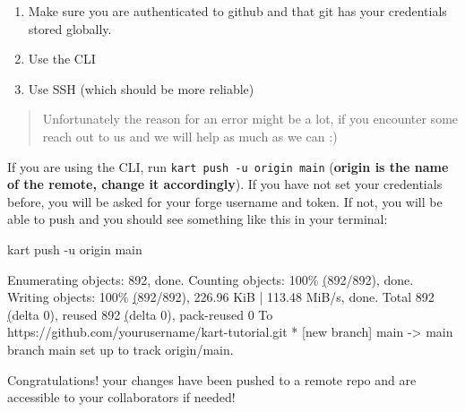 \documentclass[
  letterpaper,
  DIV=11,
  numbers=noendperiod]{scrartcl}
\newenvironment{Shaded}{\begin{snugshade}}{\end{snugshade}}
\newcommand{\AttributeTok}[1]{\textcolor[rgb]{1.00,0.47,0.78}{#1}}
\newcommand{\ErrorTok}[1]{\textcolor[rgb]{1.00,0.33,0.33}{\underline{#1}}}
\newcommand{\ExtensionTok}[1]{\textcolor[rgb]{0.55,0.91,0.99}{#1}}
\newcommand{\KeywordTok}[1]{\textcolor[rgb]{1.00,0.47,0.78}{#1}}
\newcommand{\NormalTok}[1]{\textcolor[rgb]{0.97,0.97,0.95}{#1}}
\newcommand{\OperatorTok}[1]{\textcolor[rgb]{0.97,0.97,0.95}{#1}}
\newcommand{\StringTok}[1]{\textcolor[rgb]{0.95,0.98,0.55}{#1}}
\providecommand{\tightlist}{%
  \setlength{\itemsep}{0pt}\setlength{\parskip}{0pt}}\usepackage{longtable,booktabs,array}
\begin{document}
\begin{enumerate}
\def\labelenumi{\arabic{enumi}.}
\tightlist
\item
  Make sure you are authenticated to github and that git has your
  credentials stored globally.
\item
  Use the CLI
\item
  Use SSH (which should be more reliable)
\end{enumerate}

\begin{quote}
Unfortunately the reason for an error might be a lot, if you encounter
some reach out to us and we will help as much as we can :)
\end{quote}

If you are using the CLI, run \texttt{kart\ push\ -u\ origin\ main}
(\textbf{origin is the name of the remote, change it accordingly}). If
you have not set your credentials before, you will be asked for your
forge username and token. If not, you will be able to push and you
should see something like this in your terminal:

\begin{Shaded}
\begin{Highlighting}[]
\ExtensionTok{kart}\NormalTok{ push }\AttributeTok{{-}u}\NormalTok{ origin main}

\ExtensionTok{Enumerating}\NormalTok{ objects: 892, done.}
\ExtensionTok{Counting}\NormalTok{ objects: 100\% }\ErrorTok{(}\ExtensionTok{892/892}\KeywordTok{)}\ExtensionTok{,}\NormalTok{ done.}
\ExtensionTok{Writing}\NormalTok{ objects: 100\% }\ErrorTok{(}\ExtensionTok{892/892}\KeywordTok{)}\ExtensionTok{,}\NormalTok{ 226.96 KiB }\KeywordTok{|} \ExtensionTok{113.48}\NormalTok{ MiB/s, done.}
\ExtensionTok{Total}\NormalTok{ 892 }\ErrorTok{(}\ExtensionTok{delta}\NormalTok{ 0}\KeywordTok{)}\ExtensionTok{,}\NormalTok{ reused 892 }\ErrorTok{(}\ExtensionTok{delta}\NormalTok{ 0}\KeywordTok{)}\ExtensionTok{,}\NormalTok{ pack{-}reused 0}
\ExtensionTok{To}\NormalTok{ https://github.com/yourusername/kart{-}tutorial.git}
 \ExtensionTok{*}\NormalTok{ [new branch]      main }\AttributeTok{{-}}\OperatorTok{\textgreater{}}\NormalTok{ main}
\ExtensionTok{branch} \StringTok{\textquotesingle{}main\textquotesingle{}}\NormalTok{ set up to track }\StringTok{\textquotesingle{}origin/main\textquotesingle{}}\NormalTok{.}
\end{Highlighting}
\end{Shaded}

Congratulations! your changes have been pushed to a remote repo and are
accessible to your collaborators if needed!
\end{document}
